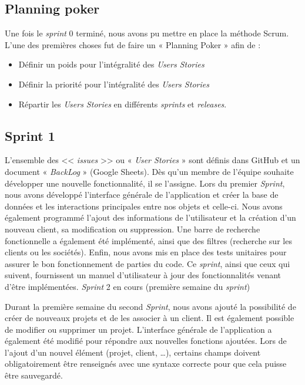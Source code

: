 \documentclass[12pt,a4paper,openany]{article}
\begin{document}
	\subsection{Planning poker}
	Une fois le \textit{sprint} 0 terminé, nous avons pu mettre en place la méthode Scrum. L’une des premières choses fut de faire un « Planning Poker » afin
	de : 
	\begin{itemize}
		\item Définir un poids pour l'intégralité des \textit{Users Stories}
		\item Définir la priorité pour l'intégralité des \textit{Users Stories}
		\item Répartir les \textit{Users Stories} en différents \textit{sprints} et \textit{releases}. 
	\end{itemize}

	\subsection{Sprint 1}
	L'ensemble des << \textit{issues} >> ou « \textit{User Stories} » sont définis dans GitHub et un document « \textit{BackLog} » (Google Sheets). Dès qu'un membre de l'équipe
	souhaite développer une nouvelle fonctionnalité, il se l'assigne. Lors du premier \textit{Sprint}, nous avons développé l'interface générale de
	l'application et créer la base de données et les interactions principales entre nos objets et celle-ci. Nous avons également programmé l'ajout des
	informations de l'utilisateur et la création d’un nouveau client, sa modification ou suppression. Une barre de recherche fonctionnelle a également
	été implémenté, ainsi que des filtres (recherche sur les clients ou les sociétés). Enfin, nous avons mis en place des tests unitaires pour assurer
	le bon fonctionnement de parties du code. 
	Ce \textit{sprint}, ainsi que ceux qui suivent, fournissent un manuel d’utilisateur à jour des fonctionnalités venant d’être implémentées.  
	\textit{Sprint} 2 en cours (première semaine du \textit{sprint})

	Durant la première semaine du second \textit{Sprint}, nous avons ajouté la possibilité de créer de nouveaux projets et de les associer à un client. Il est
	également possible de modifier ou supprimer un projet. L'interface générale de l’application a également été modifié pour répondre aux nouvelles
	fonctions ajoutées. Lors de l'ajout d’un nouvel élément (projet, client, …), certains champs doivent obligatoirement être renseignés avec une
	syntaxe correcte pour que cela puisse être sauvegardé. 
\end{document}
